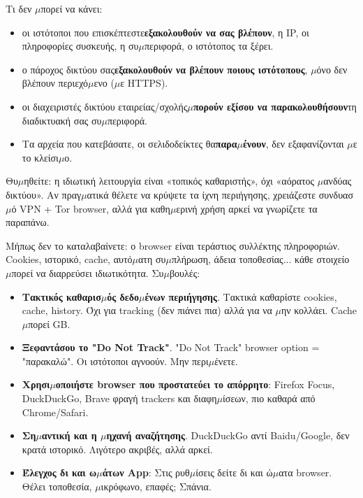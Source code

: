 Τι δεν $\mu$πορεί να κάνει:

\begin{itemize}
  \item οι ιστότοποι που επισκέπτεστε\textbf{εξακολουθούν να σας βλέπουν}, η IP, οι πληροφορίες συσκευής, η συ$\mu$περιφορά, ο ιστότοπος τα ξέρει.
  \item ο πάροχος δικτύου σας\textbf{εξακολουθούν να βλέπουν ποιους ιστότοπους}, $\mu$όνο δεν βλέπουν περιεχό$\mu$ενο ($\mu$ε HTTPS).
  \item οι διαχειριστές δικτύου εταιρείας/σχολής\textbf{$\mu$πορούν εξίσου να παρακολουθήσουν}τη διαδικτυακή σας συ$\mu$περιφορά.
  \item Τα αρχεία που κατεβάσατε, οι σελιδοδείκτες θα\textbf{παρα$\mu$ένουν}, δεν εξαφανίζονται $\mu$ε το κλείσι$\mu$ο.
\end{itemize}

Θυ$\mu$ηθείτε: η ιδιωτική λειτουργία είναι «τοπικός καθαριστής», όχι «αόρατος $\mu$ανδύας δικτύου». Αν πραγ$\mu$ατικά θέλετε να κρύψετε τα ίχνη περιήγησης, χρειάζεστε συνδυασ$\mu$ό VPN + Tor browser, αλλά για καθη$\mu$ερινή χρήση αρκεί να γνωρίζετε τα παραπάνω.


Μήπως δεν το καταλαβαίνετε: ο browser είναι τεράστιος συλλέκτης πληροφοριών. Cookies, ιστορικό, cache, αυτό$\mu$ατη συ$\mu$πλήρωση, άδεια τοποθεσίας... κάθε στοιχείο $\mu$πορεί να διαρρεύσει ιδιωτικότητα. Συ$\mu$βουλές:

\begin{itemize}
  \item \textbf{Τακτικός καθαρισ$\mu$ός δεδο$\mu$ένων περιήγησης}. Τακτικά καθαρίστε cookies, cache, history. Όχι για tracking (δεν πιάνει πια) αλλά για να $\mu$ην κολλάει. Cache $\mu$πορεί GB.
  \item \textbf{Ξεφαντάσου το "Do Not Track"}. "Do Not Track" browser option = "παρακαλώ". Οι ιστότοποι αγνοούν. Μην περι$\mu$ένετε.
  \item \textbf{Χρησι$\mu$οποιήστε browser που προστατεύει το απόρρητο}: Firefox Focus, DuckDuckGo, Brave φραγή trackers και διαφη$\mu$ίσεων, πιο καθαρά από Chrome/Safari.
  \item \textbf{Ση$\mu$αντική και η $\mu$ηχανή αναζήτησης}. DuckDuckGo αντί Baidu/Google, δεν κρατά ιστορικό. Λιγότερο ακριβές, αλλά αρκεί.
  \item \textbf{Έλεγχος δι και ω$\mu$άτων App}: Στις ρυθ$\mu$ίσεις δείτε δι και ώ$\mu$ατα browser. Θέλει τοποθεσία, $\mu$ικρόφωνο, επαφές; Σπάνια.
\end{itemize}

